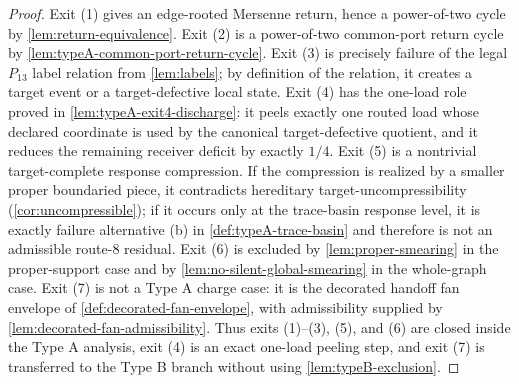 \documentclass[11pt]{article}
\begin{document}
\begin{proof}
Exit (1) gives an edge-rooted Mersenne return, hence a power-of-two cycle by
\cref{lem:return-equivalence}.  Exit (2) is a power-of-two common-port return
cycle by \cref{lem:typeA-common-port-return-cycle}.  Exit (3) is precisely failure of the legal $P_{13}$ label
relation from \cref{lem:labels}; by definition of the relation, it creates a
target event or a target-defective local state.  Exit (4) has the one-load role
proved in \cref{lem:typeA-exit4-discharge}: it peels exactly one routed load
whose declared coordinate is used by the canonical target-defective quotient,
and it reduces the remaining receiver deficit by exactly \(1/4\).
Exit (5) is a nontrivial target-complete response compression.  If the
compression is realized by a smaller proper boundaried piece, it contradicts hereditary
target-uncompressibility (\cref{cor:uncompressible}); if it occurs only at the
trace-basin response level, it is exactly failure alternative (b) in
\cref{def:typeA-trace-basin} and therefore is not an admissible route-8
residual.  Exit (6) is excluded by
\cref{lem:proper-smearing} in the proper-support case and by
\cref{lem:no-silent-global-smearing} in the whole-graph case.  Exit (7) is not
a Type A charge case: it is the decorated handoff fan envelope of
\cref{def:decorated-fan-envelope}, with admissibility supplied by
\cref{lem:decorated-fan-admissibility}.  Thus exits (1)--(3), (5), and (6) are
closed inside the Type A analysis, exit (4) is an exact one-load peeling step,
and exit (7) is transferred to the Type B branch without using
\cref{lem:typeB-exclusion}.
\end{proof}
\end{document}
